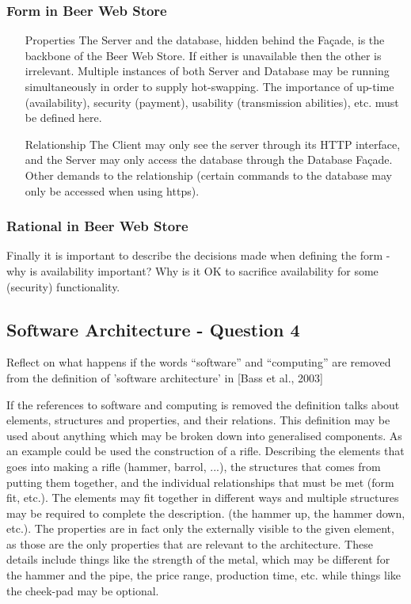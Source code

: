\subsubsection{Form in Beer Web Store}
\begin{itemize}
    \item[Properties] The Server and the database, hidden behind the Fa\c cade, is the backbone of the Beer Web Store. If either is unavailable then the other is irrelevant. Multiple instances of both Server and Database may be running simultaneously in order to supply hot-swapping. The importance of up-time (availability), security (payment), usability (transmission abilities), etc. must be defined here.
    \item[Relationship] The Client may only see the server through its
 HTTP interface, and the Server may only access the database through the Database Fa\c cade. Other demands to the relationship (certain commands to the database may only be accessed when using https).
\end{itemize}

\subsubsection{Rational in Beer Web Store}

Finally it is important to describe the decisions made when defining the form - why is availability important? Why is it OK to sacrifice availability for some (security) functionality.

\subsection{Software Architecture - Question 4}

\begin{question}
Reflect on what happens if the words ``software'' and
``computing'' are removed from the definition of 'software
architecture' in [Bass et al., 2003]
\end{question}

If the references to software and computing is removed the definition talks about elements, structures and properties, and their relations. This definition may be used about anything which may be broken down into generalised components. As an example could be used the construction of a rifle. Describing the elements that goes into making a rifle (hammer, barrol, ...), the structures that comes from putting them together, and the individual relationships that must be met (form fit, etc.). The elements may fit together in different ways and multiple structures may be required to complete the description. (the hammer up, the hammer down, etc.). The properties are in fact only the externally visible to the given element, as those are the only properties that are relevant to the architecture. These details include things like the strength of the metal, which may be different for the hammer and the pipe, the price range, production time, etc. while things like the cheek-pad may be optional.

